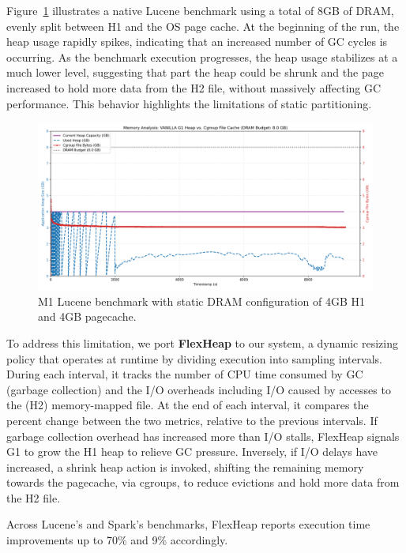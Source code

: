 Figure~\ref{fig:vanilla-dram-underutilization} illustrates a native Lucene
benchmark using a total of 8GB of DRAM, evenly split between H1 and the OS page
cache. At the beginning of the run, the heap usage rapidly spikes, indicating
that an increased number of GC cycles is occurring. As the benchmark execution
progresses, the heap usage stabilizes at a much lower level, suggesting that
part the heap could be shrunk and the page increased to hold more data from the
H2 file, without massively affecting GC performance. This behavior highlights
the limitations of static partitioning.
\begin{figure}[htbp]
	\centering
	\includegraphics[width=1\linewidth]{fig/combined_memory_timeline_vanilla_g1.png}
	\caption{
		M1 Lucene benchmark with static DRAM configuration of 4GB H1 and 4GB pagecache.
	}
	\label{fig:vanilla-dram-underutilization}
\end{figure}

To address this limitation, we port \textbf{FlexHeap} to our system, a dynamic
resizing policy that operates at runtime by dividing execution into sampling
intervals. During each interval, it tracks the number of CPU time consumed by GC
(garbage collection) and the I/O overheads including I/O caused by accesses to
the (H2) memory-mapped file. At the end of each interval, it compares the
percent change between the two metrics, relative to the previous intervals. If
garbage collection overhead has increased more than I/O stalls, FlexHeap
signals G1 to grow the H1 heap to relieve GC pressure. Inversely, if I/O delays
have increased, a shrink heap action is invoked, shifting the remaining memory
towards the pagecache, via cgroups, to reduce evictions and hold more data from
the H2 file.

Across Lucene's and Spark's benchmarks, FlexHeap
reports execution time improvements up to 70\% and 9\% accordingly.

